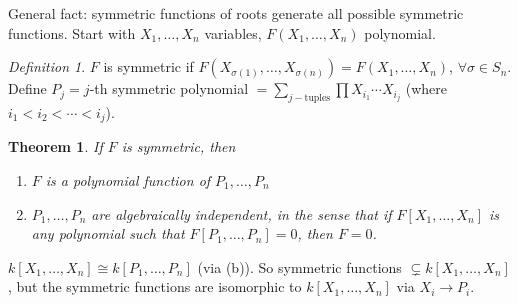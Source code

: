\documentclass{article}
\theoremstyle{plain}
\newtheorem{theorem}{Theorem}
\theoremstyle{remark}
\newtheorem{definition}{Definition}
\begin{document}
General fact: symmetric functions of roots generate all possible symmetric functions.
Start with $X_1,\dots,X_n$ variables, $F(X_1,\dots,X_n)$ polynomial.
\begin{definition}
	$F$ is symmetric if $F(X_{\sigma(1)},\dots,X_{\sigma(n)})
	= F(X_1,\dots,X_n)$, $\forall \sigma \in S_n$.
	Define $P_j = j$-th symmetric polynomial
	$ = \sum_{j-\text{tuples}} \prod X_{i_1} \cdots X_{i_j}$
	(where $i_1 < i_2 < \cdots < i_j$).
\end{definition}
\begin{theorem}
	If $F$ is symmetric, then
	\begin{enumerate}
		\item $F$ is a polynomial function of $P_1,\dots,P_n$
		\item $P_1,\dots,P_n$ are algebraically independent,
			in the sense that if $F[X_1,\dots,X_n]$ is any polynomial such that
			$F[P_1,\dots,P_n] = 0$, then $F = 0$.
	\end{enumerate}
\end{theorem}

$k[X_1,\dots,X_n] \cong k[P_1,\dots,P_n]$ (via (b)).
So symmetric functions $\subsetneq k[X_1,\dots,X_n]$,
but the symmetric functions are isomorphic to $k[X_1,\dots,X_n]$ via $X_i \to P_i$.
\end{document}
